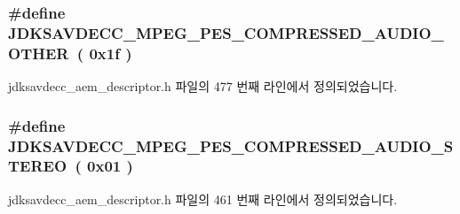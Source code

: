 \subsubsection[{\texorpdfstring{J\+D\+K\+S\+A\+V\+D\+E\+C\+C\+\_\+\+M\+P\+E\+G\+\_\+\+P\+E\+S\+\_\+\+C\+O\+M\+P\+R\+E\+S\+S\+E\+D\+\_\+\+A\+U\+D\+I\+O\+\_\+\+O\+T\+H\+ER}{JDKSAVDECC_MPEG_PES_COMPRESSED_AUDIO_OTHER}}]{\setlength{\rightskip}{0pt plus 5cm}\#define J\+D\+K\+S\+A\+V\+D\+E\+C\+C\+\_\+\+M\+P\+E\+G\+\_\+\+P\+E\+S\+\_\+\+C\+O\+M\+P\+R\+E\+S\+S\+E\+D\+\_\+\+A\+U\+D\+I\+O\+\_\+\+O\+T\+H\+ER~( 0x1f )}\hypertarget{group__mpeg__pes__compressed__audio_ga8c6b9294758992d20a7352fb36c335d2}{}\label{group__mpeg__pes__compressed__audio_ga8c6b9294758992d20a7352fb36c335d2}


jdksavdecc\+\_\+aem\+\_\+descriptor.\+h 파일의 477 번째 라인에서 정의되었습니다.

\subsubsection[{\texorpdfstring{J\+D\+K\+S\+A\+V\+D\+E\+C\+C\+\_\+\+M\+P\+E\+G\+\_\+\+P\+E\+S\+\_\+\+C\+O\+M\+P\+R\+E\+S\+S\+E\+D\+\_\+\+A\+U\+D\+I\+O\+\_\+\+S\+T\+E\+R\+EO}{JDKSAVDECC_MPEG_PES_COMPRESSED_AUDIO_STEREO}}]{\setlength{\rightskip}{0pt plus 5cm}\#define J\+D\+K\+S\+A\+V\+D\+E\+C\+C\+\_\+\+M\+P\+E\+G\+\_\+\+P\+E\+S\+\_\+\+C\+O\+M\+P\+R\+E\+S\+S\+E\+D\+\_\+\+A\+U\+D\+I\+O\+\_\+\+S\+T\+E\+R\+EO~( 0x01 )}\hypertarget{group__mpeg__pes__compressed__audio_ga412b379568fe062f1b2de710d0a1c448}{}\label{group__mpeg__pes__compressed__audio_ga412b379568fe062f1b2de710d0a1c448}


jdksavdecc\+\_\+aem\+\_\+descriptor.\+h 파일의 461 번째 라인에서 정의되었습니다.

